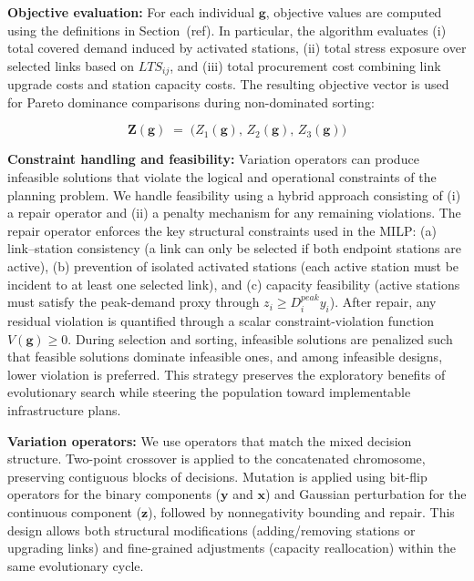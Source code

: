 \documentclass[preprint,authoryear,10pt]{elsarticle}
\begin{document}
\textbf{Objective evaluation:} For each individual $\mathbf{g}$, objective values are computed using the definitions in Section~(ref). In particular, the algorithm evaluates (i) total covered demand induced by activated stations, (ii) total stress exposure over selected links based on $LTS_{ij}$, and (iii) total procurement cost combining link upgrade costs and station capacity costs. The resulting objective vector is used for Pareto dominance comparisons during non-dominated sorting:

\begin{equation}
\mathbf{Z}(\mathbf{g}) \;=\; \big(Z_1(\mathbf{g}),\, Z_2(\mathbf{g}),\, Z_3(\mathbf{g})\big)
\end{equation}



\textbf{Constraint handling and feasibility:} Variation operators can produce infeasible solutions that violate the logical and operational constraints of the planning problem. We handle feasibility using a hybrid approach consisting of (i) a repair operator and (ii) a penalty mechanism for any remaining violations. The repair operator enforces the key structural constraints used in the MILP: (a) link--station consistency (a link can only be selected if both endpoint stations are active), (b) prevention of isolated activated stations (each active station must be incident to at least one selected link), and (c) capacity feasibility (active stations must satisfy the peak-demand proxy through $z_i \ge D_i^{peak}y_i$). After repair, any residual violation is quantified through a scalar constraint-violation function $V(\mathbf{g})\ge 0$. During selection and sorting, infeasible solutions are penalized such that feasible solutions dominate infeasible ones, and among infeasible designs, lower violation is preferred. This strategy preserves the exploratory benefits of evolutionary search while steering the population toward implementable infrastructure plans.

\textbf{Variation operators:} We use operators that match the mixed decision structure. Two-point crossover is applied to the concatenated chromosome, preserving contiguous blocks of decisions. Mutation is applied using bit-flip operators for the binary components ($\mathbf{y}$ and $\mathbf{x}$) and Gaussian perturbation for the continuous component ($\mathbf{z}$), followed by nonnegativity bounding and repair. This design allows both structural modifications (adding/removing stations or upgrading links) and fine-grained adjustments (capacity reallocation) within the same evolutionary cycle.
\end{document}

